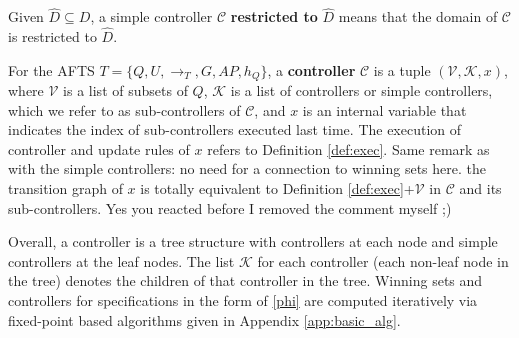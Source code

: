 Given $\widehat{D} \subseteq D$, a simple controller $ \mathcal{C} $ \textbf{restricted to} $ \widehat{D} $ means that the domain of $ \mathcal{C} $ is restricted to $\widehat{D}$.

\begin{definition}
	For the AFTS $ T=\{Q,U,\rightarrow_T,G,AP,h_Q\} $, a \textbf{controller} $ \mathcal{C} $ is a tuple $ (\mathcal{V},\mathcal{K},x) $, where $ \mathcal{V} $ is a list of subsets of $ Q $, $ \mathcal{K} $ is a list of controllers or simple controllers, {\color{purple} which we refer to as} sub-controllers of $ \mathcal{C} $, and $ x $ is an internal variable that indicates the index of sub-controllers executed last time. {\color{teal} The execution of controller and update rules of $ x $ refers to Definition \ref{def:exec}}. {\color{purple} Same remark as with the simple controllers: no need for a connection to winning sets here.} {\color{teal} the transition graph of $ x $ is totally equivalent to  Definition \ref{def:exec}+$ \mathcal{V} $ in $ \mathcal{C} $ and its sub-controllers.} {\color{purple} Yes you reacted before I removed the comment myself ;)}
\end{definition}

 Overall, a controller is a tree structure with controllers at each node and simple controllers at the leaf nodes. The list $\mathcal{K}$ for each controller (each non-leaf node in the tree) denotes the children of that controller in the tree. Winning sets and controllers for specifications in the form of \eqref{phi} are computed iteratively via fixed-point based algorithms given in Appendix \ref{app:basic_alg}.



